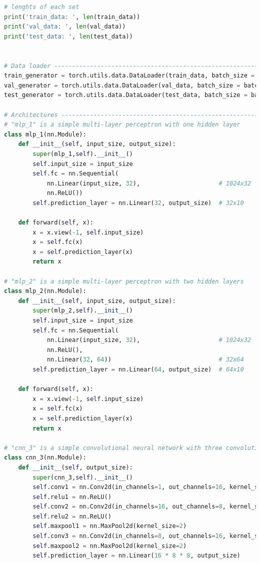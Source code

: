 \documentclass[3p,times,procedia]{elsarticle}
\begin{document}
\begin{lstlisting}[language=Python]
# lenghts of each set
print('train_data: ', len(train_data))
print('val_data: ', len(val_data))
print('test_data: ', len(test_data))


# Data loader ----------------------------------------------------------------------------------------------------------------------------------------#
train_generator = torch.utils.data.DataLoader(train_data, batch_size = batch_size, shuffle = True)
val_generator = torch.utils.data.DataLoader(val_data, batch_size = batch_size )
test_generator = torch.utils.data.DataLoader(test_data, batch_size = batch_size ) 

# Architectures ---------------------------------------------------------------------------------------------------------------------------------------#
# "mlp_1" is a simple multi-layer perceptron with one hidden layer
class mlp_1(nn.Module):
    def __init__(self, input_size, output_size):
        super(mlp_1,self).__init__()
        self.input_size = input_size
        self.fc = nn.Sequential(
            nn.Linear(input_size, 32),                      # 1024x32
            nn.ReLU())                                      
        self.prediction_layer = nn.Linear(32, output_size)  # 32x10
    
    def forward(self, x):
        x = x.view(-1, self.input_size)
        x = self.fc(x)
        x = self.prediction_layer(x)
        return x
    
# "mlp_2" is a simple multi-layer perceptron with two hidden layers
class mlp_2(nn.Module):
    def __init__(self, input_size, output_size):
        super(mlp_2,self).__init__()
        self.input_size = input_size
        self.fc = nn.Sequential(
            nn.Linear(input_size, 32),                      # 1024x32
            nn.ReLU(),
            nn.Linear(32, 64))                              # 32x64
        self.prediction_layer = nn.Linear(64, output_size)  # 64x10
    
    def forward(self, x):
        x = x.view(-1, self.input_size)
        x = self.fc(x)
        x = self.prediction_layer(x)
        return x
    
# "cnn_3" is a simple convolutional neural network with three convolutional layers
class cnn_3(nn.Module):
    def __init__(self, output_size):
        super(cnn_3,self).__init__()
        self.conv1 = nn.Conv2d(in_channels=1, out_channels=16, kernel_size=3, padding=1)  # 1x32x32 -> 16x32x32
        self.relu1 = nn.ReLU()
        self.conv2 = nn.Conv2d(in_channels=16, out_channels=8, kernel_size=5, padding=2)  # 16x32x32 -> 8x32x32
        self.relu2 = nn.ReLU()
        self.maxpool1 = nn.MaxPool2d(kernel_size=2)                                       # 8x32x32 -> 8x16x16                        
        self.conv3 = nn.Conv2d(in_channels=8, out_channels=16, kernel_size=7, padding=3)  # 8x16x16 -> 16x16x16
        self.maxpool2 = nn.MaxPool2d(kernel_size=2)                                       # 16x16x16 -> 16x8x8
        self.prediction_layer = nn.Linear(16 * 8 * 8, output_size)                        # 16x8x8 -> 10


\end{lstlisting}
\end{document}

